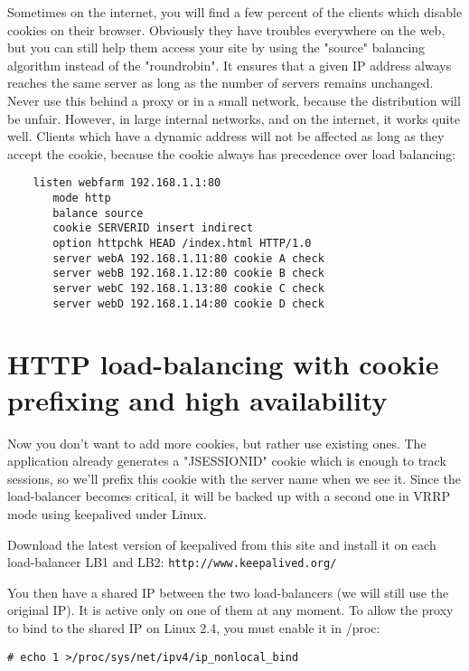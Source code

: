 Sometimes on the internet, you will find a few percent of the clients which
disable cookies on their browser. Obviously they have troubles everywhere on
the web, but you can still help them access your site by using the "source"
balancing algorithm instead of the "roundrobin". It ensures that a given IP
address always reaches the same server as long as the number of servers remains
unchanged. Never use this behind a proxy or in a small network, because the
distribution will be unfair. However, in large internal networks, and on the
internet, it works quite well. Clients which have a dynamic address will not
be affected as long as they accept the cookie, because the cookie always has
precedence over load balancing:

\begin{verbatim}
    listen webfarm 192.168.1.1:80
       mode http
       balance source
       cookie SERVERID insert indirect
       option httpchk HEAD /index.html HTTP/1.0
       server webA 192.168.1.11:80 cookie A check
       server webB 192.168.1.12:80 cookie B check
       server webC 192.168.1.13:80 cookie C check
       server webD 192.168.1.14:80 cookie D check
\end{verbatim}

\section{HTTP load-balancing with cookie prefixing and high availability}

Now you don't want to add more cookies, but rather use existing ones. The
application already generates a "JSESSIONID" cookie which is enough to track
sessions, so we'll prefix this cookie with the server name when we see it.
Since the load-balancer becomes critical, it will be backed up with a second
one in VRRP mode using keepalived under Linux.

Download the latest version of keepalived from this site and install it
on each load-balancer LB1 and LB2:
\verb|http://www.keepalived.org/|

You then have a shared IP between the two load-balancers (we will still use the
original IP). It is active only on one of them at any moment. To allow the
proxy to bind to the shared IP on Linux 2.4, you must enable it in /proc:

\verb|# echo 1 >/proc/sys/net/ipv4/ip_nonlocal_bind|

